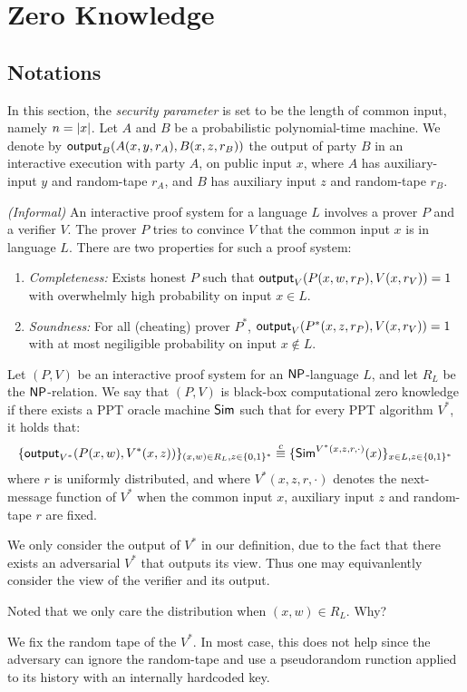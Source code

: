 \section{Zero Knowledge}
\subsection{Notations}
In this section, the {\it security parameter} is set to be the length of common input, namely $n=\left|x\right|$. Let $A$ and $B$ be a probabilistic polynomial-time machine. We denote by ${\sf output}_B(A(x,y,r_A),B(x,z,r_B))$ the output of party $B$ in an interactive execution with party $A$, on public input $x$, where $A$ has auxiliary-input $y$ and random-tape $r_A$, and $B$ has auxiliary input $z$ and random-tape $r_B$.
\begin{definition} {\it(Informal)} An interactive proof system for a language $L$ involves a prover $P$ and a verifier $V$. The prover $P$ tries to convince $V$ that the common input $x$ is in language $L$. There are two properties for such a proof system:
\begin{enumerate}
\item {\it Completeness:} Exists honest $P$ such that ${\sf output}_V(P(x,w,r_P),V(x,r_V))=1$ with overwhelmly high probability on input $x\in L$.
\item {\it Soundness:} For all (cheating) prover $P^*$, ${\sf output}_V(P^*(x,z,r_P),V(x,r_V))=1$ with at most negiligible probability on input $x\notin L$.
\end{enumerate}
\end{definition}

\begin{definition} Let $(P,V)$ be an interactive proof system for an $\mathsf{NP}$-language $L$, and let $R_L$ be the $\mathsf{NP}$-relation. We say that $(P,V)$ is {\sf black-box computational zero knowledge} if there exists a PPT oracle machine ${\sf Sim}$ such that for every PPT algorithm $V^*$, it holds that:
$$\{{\sf output}_{V^*}(P(x,w),V^*(x,z))\}_{(x,w)\in R_L,z\in\{0,1\}^*}\stackrel{c}{\equiv}\{{\sf Sim}^{V^*(x,z,r,\cdot)}(x)\}_{x\in L,z\in\{0,1\}^*}$$
where $r$ is uniformly distributed, and where $V^*(x,z,r,\cdot)$ denotes the next-message function of $V^*$ when the common input $x$, auxiliary input $z$ and random-tape $r$ are fixed.
\end{definition}
We only consider the output of $V^*$ in our definition, due to the fact that there exists an adversarial $V^*$ that outputs its view. Thus one may equivanlently consider the view of the verifier and its output.
\begin{remark} Noted that we only care the distribution when $(x,w)\in R_L$. Why?
\end{remark}
\begin{remark} We fix the random tape of the $V^*$. In most case, this does not help since the adversary can ignore the random-tape and use a pseudorandom runction applied to its history with an internally hardcoded key.
\end{remark}

